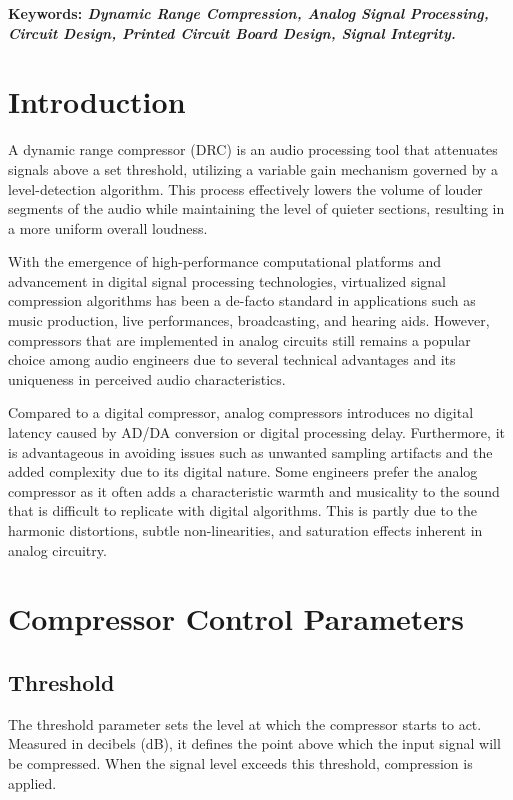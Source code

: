 \documentclass[10pt]{article}
\begin{document}
    \begin{multicols*}{2}

        \textbf{
            Keywords: 
            \textit{Dynamic Range Compression, Analog Signal Processing, Circuit Design, Printed Circuit Board Design, Signal Integrity.}
        }

        \section{Introduction}
            A dynamic range compressor (DRC) is an audio processing tool that attenuates signals above a set threshold, utilizing a variable gain mechanism governed by a level-detection algorithm. This process effectively lowers the volume of louder segments of the audio while maintaining the level of quieter sections, resulting in a more uniform overall loudness.\par
            With the emergence of high-performance computational platforms and advancement in digital signal processing technologies, virtualized signal compression algorithms has been a de-facto standard in applications such as music production, live performances, broadcasting, and hearing aids. However, compressors that are implemented in analog circuits still remains a popular choice among audio engineers due to several technical advantages and its uniqueness in perceived audio characteristics.\par
            Compared to a digital compressor, analog compressors introduces no digital latency caused by AD/DA conversion or digital processing delay. Furthermore, it is advantageous in avoiding issues such as unwanted sampling artifacts and the added complexity due to its digital nature. Some engineers prefer the analog compressor as it often adds a characteristic warmth and musicality to the sound that is difficult to replicate with digital algorithms. This is partly due to the harmonic distortions, subtle non-linearities, and saturation effects inherent in analog circuitry.

        \section{Compressor Control Parameters}
        
            \subsection{Threshold}
                The threshold parameter sets the level at which the compressor starts to act. Measured in decibels (dB), it defines the point above which the input signal will be compressed. When the signal level exceeds this threshold, compression is applied.


\end{multicols*}
\end{document}
